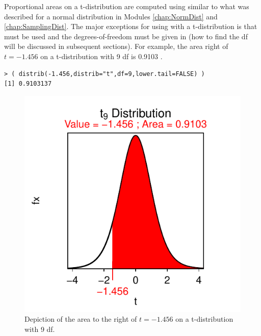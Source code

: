 \documentclass[10pt,openany]{book}\usepackage[]{graphicx}\usepackage[]{color}
\makeatletter
\newenvironment{kframe}{%
 \def\at@end@of@kframe{}%
 \ifinner\ifhmode%
  \def\at@end@of@kframe{\end{minipage}}%
  \begin{minipage}{\columnwidth}%
 \fi\fi%
 \def\FrameCommand##1{\hskip\@totalleftmargin \hskip-\fboxsep
 \colorbox{shadecolor}{##1}\hskip-\fboxsep
     \hskip-\linewidth \hskip-\@totalleftmargin \hskip\columnwidth}%
 \MakeFramed {\advance\hsize-\width
   \@totalleftmargin\z@ \linewidth\hsize
   \@setminipage}}%
 {\par\unskip\endMakeFramed%
 \at@end@of@kframe}
\newenvironment{knitrout}{}{} %
\makeatother
\begin{document}

Proportional areas on a t-distribution are computed using  similar to what was described for a normal distribution in Modules \ref{chap:NormDist} and \ref{chap:SamplingDist}.  The major exceptions for using  with a t-distribution is that  must be used and the degrees-of-freedom must be given in  (how to find the df will be discussed in subsequent sections).  For example, the area right of $t=-1.456$ on a t-distribution with 9 df is 0.9103 .
\begin{knitrout}
\color{fgcolor}\begin{kframe}
\begin{verbatim}
> ( distrib(-1.456,distrib="t",df=9,lower.tail=FALSE) )
[1] 0.9103137
\end{verbatim}
\end{kframe}\begin{figure}[hbtp]

{\centering \includegraphics[width=.4\linewidth]{Figs/tarea1-1} 

}

\caption[Depiction of the area to the right of $t=-1.456$ on a t-distribution with 9 df]{Depiction of the area to the right of $t=-1.456$ on a t-distribution with 9 df.}\label{fig:tarea1}
\end{figure}


\end{knitrout}
\end{document}
